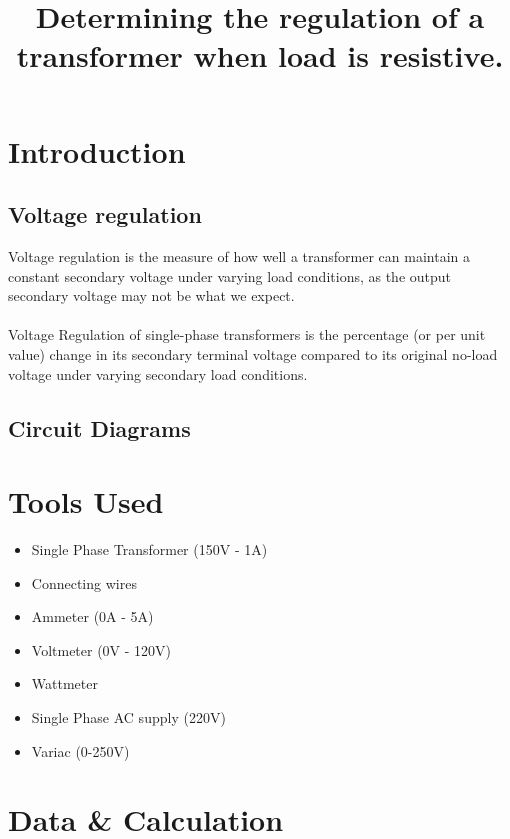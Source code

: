 \documentclass[12pt]{article}
\title{Determining the regulation of a transformer when load is resistive.}
\author{}
\date{}
\begin{document}

\pagebreak

\maketitle
\section{Introduction}
\subsection*{Voltage regulation}
Voltage regulation is the measure of how well a transformer can maintain a constant secondary voltage under varying load conditions, as the output secondary voltage may not be what we expect.\\\\
Voltage Regulation of single-phase transformers is the percentage (or per unit value) change in its secondary terminal voltage compared to its original no-load voltage under varying secondary load conditions.\cite{trans}


\subsection*{Circuit Diagrams}


\pagebreak
\section{Tools Used}
\begin{itemize}
    \item Single Phase Transformer (150V - 1A)
    \item Connecting wires
    \item Ammeter (0A - 5A)
    \item Voltmeter (0V - 120V)
    \item Wattmeter
    \item Single Phase AC supply (220V)
    \item Variac (0-250V)
\end{itemize}

\section{Data \& Calculation}
\end{document}
